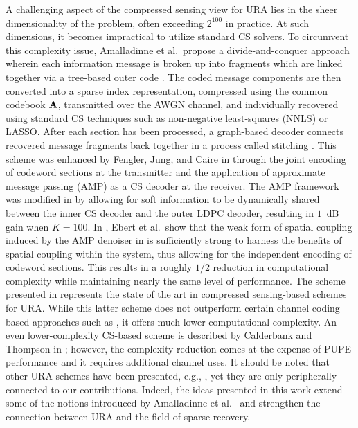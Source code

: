 \documentclass[journal]{IEEEtran}
\begin{document}
A challenging aspect of the compressed sensing view for URA lies in the sheer dimensionality of the problem, often exceeding $2^{100}$ in practice.  
At such dimensions, it becomes impractical to utilize standard CS solvers.
To circumvent this complexity issue, Amalladinne et al.\ propose a divide-and-conquer approach wherein each information message is broken up into fragments which are linked together via a tree-based outer code \cite{amalladinne2019coded}. 
The coded message components are then converted into a sparse index representation, compressed using the common codebook $\mathbf{A}$, transmitted over the AWGN channel, and individually recovered using standard CS techniques such as non-negative least-squares (NNLS) or LASSO.
After each section has been processed, a graph-based decoder connects recovered message fragments back together in a process called stitching \cite{amalladinne2019coded}. 
This scheme was enhanced by Fengler, Jung, and Caire in \cite{fengler2019sparcs} through the joint encoding of codeword sections at the transmitter and the application of approximate message passing (AMP) as a CS decoder at the receiver.  
The AMP framework was modified in \cite{amalladinne2020unsourced} by allowing for soft information to be dynamically shared between the inner CS decoder and the outer LDPC decoder, resulting in $1$~dB gain when $K = 100$. 
In \cite{ebert2020hybrid}, Ebert et al.\ show that the weak form of spatial coupling induced by the AMP denoiser in \cite{amalladinne2020unsourced} is sufficiently strong to harness the benefits of spatial coupling within the system, thus allowing for the independent encoding of codeword sections. 
This results in a roughly ${1}/{2}$ reduction in computational complexity while maintaining nearly the same level of performance.
The scheme presented in \cite{amalladinne2020unsourced} represents the state of the art in compressed sensing-based schemes for URA.
While this latter scheme does not outperform certain channel coding based approaches such as \cite{pradhan2019polar}, it offers much lower computational complexity.
An even lower-complexity CS-based scheme is described by Calderbank and Thompson in \cite{calderbank2018chirrup}; however, the complexity reduction comes at the expense of PUPE performance and it requires additional channel uses.
It should be noted that other URA schemes have been presented, e.g., \cite{kasper2020scheduling,decurninge2020tensorbased,shyianov2020massive,nassaji2022unsourced}, yet they are only peripherally connected to our contributions.
Indeed, the ideas presented in this work extend some of the notions introduced by Amalladinne et al.~\cite{amalladinne2020unsourced} and strengthen the connection between URA and the field of sparse recovery.
\end{document}
